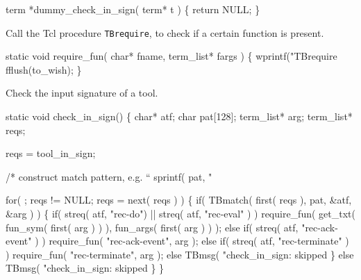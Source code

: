 

\nwenddocs{}\endmoddef\let\nwnotused=\nwoutput{}
term *dummy_check_in_sign( term* t )
\{
   return NULL;
\}
\nwendcode{}\nwdocspar


Call the Tcl procedure {\tt TBrequire}, to check if a certain
function is present.

\nwenddocs{}\endmoddef\let\nwnotused=\nwoutput{}
static void require_fun( char* fname, term_list* fargs )
\{
   wprintf("TBrequire %
   fflush(to_wish);
\}
\nwendcode{}\nwdocspar


Check the input signature of a tool.

\nwenddocs{}\endmoddef\let\nwnotused=\nwoutput{}
static void check_in_sign()
\{
   char*      atf;
   char       pat[128];
   term_list* arg;
   term_list* reqs;

   reqs = tool_in_sign;
   
   /* construct match pattern, e.g. ``%
   sprintf( pat, "%

   for( ; reqs != NULL; reqs = next( reqs ) )
   \{
      if( TBmatch( first( reqs ), pat, &atf, &arg ) )
      \{
         if( streq( atf, "rec-do") || streq( atf, "rec-eval" ) )
            require_fun( get_txt( fun_sym( first( arg ) ) ), 
                         fun_args( first( arg ) ) );
         else
         if( streq( atf, "rec-ack-event" ) )
            require_fun( "rec-ack-event", arg );
         else
         if( streq( atf, "rec-terminate" ) )
            require_fun( "rec-terminate", arg );
         else
            TBmsg( "check_in_sign: skipped %
      \}
      else
         TBmsg( "check_in_sign: skipped %
   \}
\}
\nwendcode{}\nwdocspar


